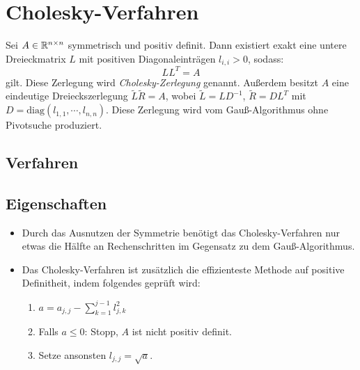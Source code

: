 	\section{Cholesky-Verfahren}
		Sei \(A \in \mathbb{R}^{n \times n}\) symmetrisch und positiv definit. Dann existiert exakt eine untere Dreieckmatrix \(L\) mit positiven Diagonaleinträgen \( l_{i,i} > 0 \), sodass:
		\begin{equation*}
			LL^T = A
		\end{equation*}
		gilt. Diese Zerlegung wird \textit{Cholesky-Zerlegung} genannt. Außerdem besitzt \(A\) eine eindeutige Dreieckszerlegung \( \tilde{L}\tilde{R} = A \), wobei \( \tilde{L} = LD^{-1} \), \( \tilde{R} = DL^T \) mit \( D = \textrm{diag}(l_{1,1}, \cdots, l_{n,n}) \). Diese Zerlegung wird vom Gauß-Algorithmus ohne Pivotsuche produziert.

		\subsection{Verfahren}
			\begin{algorithm}[H]
			\end{algorithm}

		\subsection{Eigenschaften}
			\begin{itemize}
				\item Durch das Ausnutzen der Symmetrie benötigt das Cholesky-Verfahren nur etwas die Hälfte an Rechenschritten im Gegensatz zu dem Gauß-Algorithmus.
				\item Das Cholesky-Verfahren ist zusätzlich die effizienteste Methode auf positive Definitheit, indem folgendes geprüft wird:
					\begin{enumerate}
						\item \( a = a_{j,j} - \sum_{k=1}^{j-1} l_{j,k}^2 \)
						\item Falls \( a \leq 0 \): Stopp, \(A\) ist nicht positiv definit.
						\item Setze ansonsten \( l_{j,j} = \sqrt{a} \).
					\end{enumerate}
			\end{itemize}

